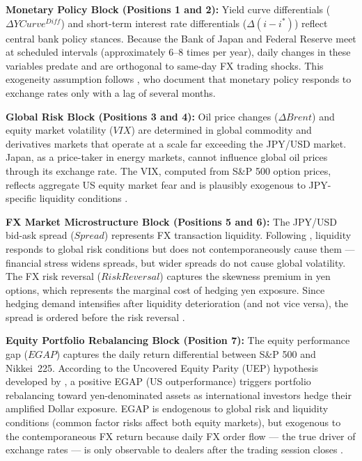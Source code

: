 \documentclass[12pt]{article}
\begin{document}
\textbf{Monetary Policy Block (Positions 1 and 2):} Yield curve differentials ($\Delta YCurve^{Diff}$) and short-term interest rate differentials ($\Delta(i-i^*)$) reflect central bank policy stances. Because the Bank of Japan and Federal Reserve meet at scheduled intervals (approximately 6--8 times per year), daily changes in these variables predate and are orthogonal to same-day FX trading shocks. This exogeneity assumption follows \textcite{eichenbaum1995some}, who document that monetary policy responds to exchange rates only with a lag of several months.

\textbf{Global Risk Block (Positions 3 and 4):} Oil price changes ($\Delta Brent$) and equity market volatility ($VIX$) are determined in global commodity and derivatives markets that operate at a scale far exceeding the JPY/USD market. Japan, as a price-taker in energy markets, cannot influence global oil prices through its exchange rate. The VIX, computed from S\&P 500 option prices, reflects aggregate US equity market fear and is plausibly exogenous to JPY-specific liquidity conditions \parencite{brunnermeier2009carry}.

\textbf{FX Market Microstructure Block (Positions 5 and 6):} The JPY/USD bid-ask spread ($Spread$) represents FX transaction liquidity. Following \textcite{engel2016exchange}, liquidity responds to global risk conditions but does not contemporaneously cause them --- financial stress widens spreads, but wider spreads do not cause global volatility. The FX risk reversal ($RiskReversal$) captures the skewness premium in yen options, which represents the marginal cost of hedging yen exposure. Since hedging demand intensifies after liquidity deterioration (and not vice versa), the spread is ordered before the risk reversal \parencite{gagnon2007carry}.

\textbf{Equity Portfolio Rebalancing Block (Position 7):} The equity performance gap ($EGAP$) captures the daily return differential between S\&P 500 and Nikkei~225. According to the Uncovered Equity Parity (UEP) hypothesis developed by \textcite{hau2006exchange}, a positive EGAP (US outperformance) triggers portfolio rebalancing toward yen-denominated assets as international investors hedge their amplified Dollar exposure. EGAP is endogenous to global risk and liquidity conditions (common factor risks affect both equity markets), but exogenous to the contemporaneous FX return because daily FX order flow --- the true driver of exchange rates --- is only observable to dealers after the trading session closes \parencite{evans2002order, ding2013portfolio}.
\end{document}
